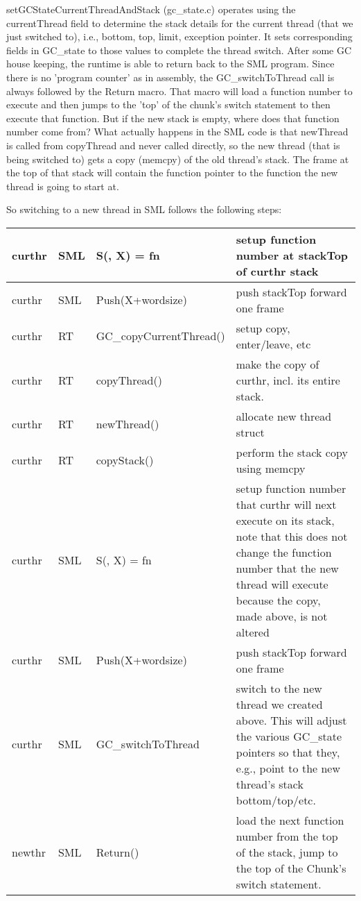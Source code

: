 setGCStateCurrentThreadAndStack (gc\_state.c) operates using the currentThread field to determine the stack details for the current thread (that we just switched to), i.e., bottom, top, limit, exception pointer. It sets corresponding fields in GC\_state to those values to complete the thread switch. After some GC house keeping, the runtime is able to return back to the SML program. Since there is no 'program counter' as in assembly, the GC\_switchToThread call is always followed by the Return macro. That macro will load a function number to execute and then jumps to the 'top' of the chunk's switch statement to then execute that function. But if the new stack is empty, where does that function number come from? What actually happens in the SML code is that newThread is called from copyThread and never called directly, so the new thread (that is being switched to) gets a copy (memcpy) of the old thread's stack. The frame at the top of that stack will contain the function pointer to the function the new thread is going to start at. 

So switching to a new thread in SML follows the following steps:

\begin{table}[H]
\begin{tabular}{|l|l|l|p{10cm}|}
\hline
curthr & SML & S(, X) = fn & setup function number at stackTop of curthr stack \\ \hline
curthr & SML & Push(X+wordsize) & push stackTop forward one frame \\ \hline
curthr & RT & GC\_copyCurrentThread() & setup copy, enter/leave, etc \\ \hline
curthr & RT & \-\hspace{1cm}copyThread() & make the copy of curthr, incl. its entire stack. \\ \hline
curthr & RT & \-\hspace{2cm}newThread() & allocate new thread struct \\ \hline
curthr & RT & \-\hspace{2cm}copyStack() & perform the stack copy using memcpy\\ \hline
curthr & SML & S(, X) = fn & setup function number that curthr will next execute on its stack, note that this does not change the function number that the new thread will execute because the copy, made above, is not altered \\ \hline
curthr & SML & Push(X+wordsize) & push stackTop forward one frame \\ \hline
curthr & SML & GC\_switchToThread & switch to the new thread we created above. This will
adjust the various GC\_state pointers so that they, e.g., point to the new thread's stack
bottom/top/etc. \\ \hline
newthr & SML & Return() & load the next function number from the top of the stack, jump
to the top of the Chunk's switch statement. \\ \hline

\end{tabular}
\end{table}






